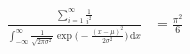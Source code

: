 \documentclass[12pt]{article}
\begin{document}
\begin{align*}
\frac{\sum_{i=1}^\infty \frac{1}{i^2}}{ \int_{-\infty}^\infty
   \frac{1}{\sqrt{2\pi\sigma^2}} \exp\bigl(-\frac{(x-\mu)^2}{2\sigma^2}\bigr)
   \,\mathrm{d}x} &= \frac{\pi^2}{6}
\end{align*}
\end{document}
